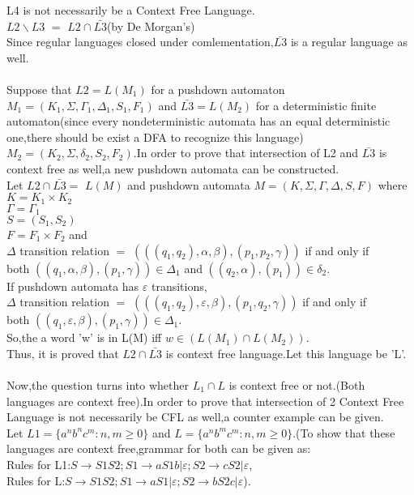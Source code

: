 \documentclass[a4paper,12pt]{article}
\begin{document}
\begin{tcolorbox}
L4 is not necessarily be a Context Free Language.\\

$L2 \backslash {L3}$ $=$ $L2 \cap \bar{L3}$(by De Morgan's)\\
Since regular languages closed under comlementation,$\bar{L3}$ is a regular language as well.\\\\
Suppose that $L2=L(M_1)$ for a pushdown automaton ${M_1}=(K_1,\Sigma,\Gamma_1,\Delta_1,S_1,F_1)$ and $\bar{L3}=L(M_2)$ for a deterministic finite automaton(since every nondeterministic automata has an equal deterministic one,there should be exist a DFA to recognize this language) ${M_2}=(K_2,\Sigma,\delta_2,S_2,F_2)$.In order to prove that intersection of L2 and $\bar{L3}$ is context free as well,a new pushdown automata can be constructed.\\
Let $L2 \cap \bar{L3}=$ $L(M)$ and pushdown automata $M=(K,\Sigma,\Gamma,\Delta,S,F)$ where \\
$K=K_1\times K_2$\\
$\Gamma = \Gamma_1$\\
$S=(S_1,S_2)$ \\
$F = F_1 \times F_2$ and \\
$\Delta$ transition relation $=$ $(((q_1,q_2),\alpha,\beta),(p_1,p_2,\gamma))$ if and only if \\ both $((q_1,\alpha,\beta),(p_1,\gamma)) \in \Delta_1$  and $((q_2,\alpha),(p_1)) \in \delta_2$.\\
If pushdown automata has $\varepsilon$ transitions,\\
$\Delta$ transition relation $=$ $(((q_1,q_2),\varepsilon,\beta),(p_1,q_2,\gamma))$ if and only if\\
both $((q_1,\varepsilon,\beta),(p_1,\gamma)) \in \Delta_1$.\\
So,the a word 'w' is in L(M) iff $w \in (L(M_1)\cap L(M_2))$.\\
Thus, it is proved that $L2 \cap \bar{L3}$ is context free language.Let this language be 'L'.\\\\
Now,the question turns into whether $L_1 \cap L$ is context free or not.(Both languages are context free).In order to prove that intersection of 2 Context Free Language is not necessarily be CFL as well,a counter example can be given.\\Let $L1=\{a^nb^nc^m:n,m\geq0\}$ and $L=\{a^nb^mc^m:n,m\geq0\}$.(To show that these languages are context free,grammar for both can be given as:\\Rules for L1:$S\to S1S2;S1\to aS1b|\varepsilon;S2\to cS2|\varepsilon$,\\Rules for L:$S\to S1S2;S1\to aS1|\varepsilon;S2\to bS2c|\varepsilon$).\\

\end{tcolorbox}
\end{document}
